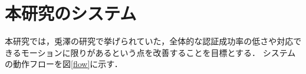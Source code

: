 \documentclass[11pt]{jarticle}
\begin{document}

\section{本研究のシステム}
本研究では，兎澤の研究\cite{tozawa}で挙げられていた，全体的な認証成功率の低さや対応できるモーションに限りがあるという点を改善することを目標とする．
システムの動作フローを図\ref{flow}に示す．
\end{document}
